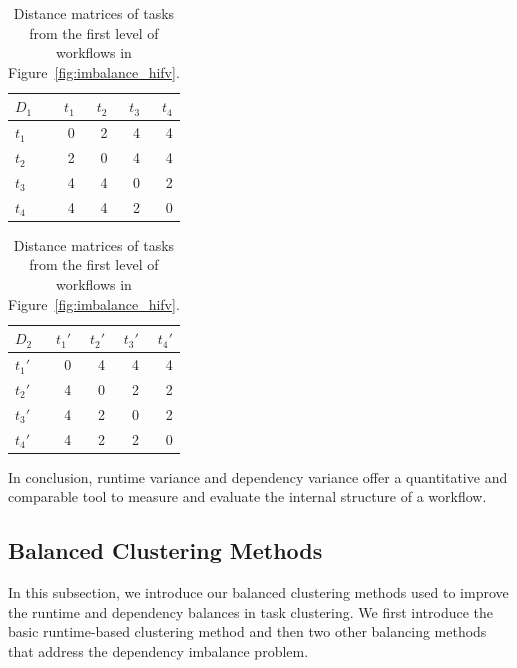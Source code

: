 \begin{table}[htb]
	\footnotesize
	\centering
	\begin{tabular}{l|rrrr}
		$D_1$ & $t_1$ & $t_2$ & $t_3$ &$t_4$\\
		\hline
		$t_1$ & 0 & 2 & 4 & 4 \\
		$t_2$ & 2 & 0 & 4 & 4 \\
		$t_3$ & 4 & 4 & 0 & 2\\
		$t_4$ & 4 & 4 & 2 & 0 \\
	\end{tabular}
	\quad
	\begin{tabular}{l|rrrr}
		$D_2$ & $t_1'$ & $t_2'$ & $t_3'$ &$t_4'$\\
		\hline
		$t_1'$ & 0 & 4 & 4 & 4 \\
		$t_2'$ & 4 & 0 & 2 & 2 \\
		$t_3'$ & 4 & 2 & 0 & 2\\
		$t_4'$ & 4 & 2 & 2 & 0 \\
	\end{tabular}
	\caption{Distance matrices of tasks from the first level of workflows in Figure~\ref{fig:imbalance_hifv}.}
	\label{tab:imblance_metric}
\end{table}

In conclusion, runtime variance and dependency variance offer a quantitative and comparable tool to measure and evaluate the internal structure of a workflow. 



\subsection{Balanced Clustering Methods}
\label{sec:methods}
In this subsection, we introduce our balanced clustering methods used to improve the runtime and dependency balances in task clustering. We first introduce the basic runtime-based clustering method and then two other balancing methods that address the dependency imbalance problem. %


